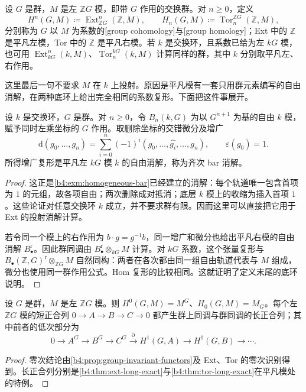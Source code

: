 \begin{definition}\label{b4:def:group-cohomology}
设 \(G\) 是群，\(M\) 是左 \(\mathbb ZG\) 模，即带 \(G\) 作用的交换群。对 \(n\ge0\)，定义
\[
H^n(G,M)\coloneqq\operatorname{Ext}_{\mathbb ZG}^n(\mathbb Z,M),
\qquad
H_n(G,M)\coloneqq\operatorname{Tor}^{\mathbb ZG}_n(\mathbb Z,M),
\]
分别称为 \(G\) 以 \(M\) 为系数的[group cohomology]与[group homology]；Ext 中的 \(\mathbb Z\) 是平凡左模，Tor 中的 \(\mathbb Z\) 是平凡右模。若 \(k\) 是交换环，且系数已给为左 \(kG\) 模，也可用 \(\operatorname{Ext}_{kG}^n(k,M)\)、\(\operatorname{Tor}^{kG}_n(k,M)\) 计算同样的群，其中 \(k\) 分别取平凡左、右作用。
\end{definition}

这里最后一句不要求 \(M\) 在 \(k\) 上投射。原因是平凡模有一套只用群元素编写的自由消解，在两种底环上给出完全相同的系数复形。下面把这件事展开。

\begin{proposition}\label{b4:prop:group-bar-resolution}
设 \(k\) 是交换环，\(G\) 是群。对 \(n\ge0\)，令 \(B_n(k,G)\) 为以 \(G^{n+1}\) 为基的自由 \(k\) 模，赋予同时左乘坐标的 \(G\) 作用。取删除坐标的交错微分及增广
\[
\mathrm{d}(g_0,\ldots,g_n)=\sum_{i=0}^n(-1)^i(g_0,\ldots,\widehat{g_i},\ldots,g_n),
\qquad \varepsilon(g_0)=1.
\]
所得增广复形是平凡左 \(kG\) 模 \(k\) 的自由消解，称为齐次 bar 消解。
\end{proposition}
\begin{proof}
这正是\cref{b4:exm:homogeneous-bar}已经建立的消解：每个轨道唯一包含首项为 \(1\) 的元组，故各项自由；两次删除成对抵消；底层 \(k\) 模上的收缩为插入首项 \(1\)。这些论证对任意交换环 \(k\) 成立，并不要求群有限。因而这里可以直接把它用于 Ext 的投射消解计算。

若令同一个模上的右作用为 \(b\cdot g=g^{-1}b\)，同一增广和微分也给出平凡右模的自由消解 \(B_\bullet^{\mathrm r}\)。因此群同调由 \(B_\bullet^{\mathrm r}\otimes_{kG}M\) 计算。对 \(kG\) 系数，这个张量复形与 \(B_\bullet(\mathbb Z,G)^{\mathrm r}\otimes_{\mathbb ZG}M\) 自然同构：两者在各次都由同一组自由轨道代表与 \(M\) 组成，微分也使用同一群作用公式。Hom 复形的比较相同。这就证明了定义末尾的底环说明。
\end{proof}

\begin{proposition}\label{b4:prop:group-homology-degree-zero}
设 \(G\) 是群，\(M\) 是左 \(\mathbb ZG\) 模。则 \(H^0(G,M)=M^G\)、\(H_0(G,M)=M_G\)。每个左 \(\mathbb ZG\) 模的短正合列 \(0\to A\to B\to C\to0\) 都产生群上同调与群同调的长正合列；其中前者的低次部分为
\[
0\longrightarrow A^G\longrightarrow B^G\longrightarrow C^G
\xrightarrow{\partial}H^1(G,A)\longrightarrow H^1(G,B)\longrightarrow\cdots.
\]
\end{proposition}
\begin{proof}
零次结论由\cref{b4:prop:group-invariant-functors}及 Ext、Tor 的零次识别得到。长正合列分别是\cref{b4:thm:ext-long-exact}与\cref{b4:thm:tor-long-exact}在平凡模处的特例。
\end{proof}

